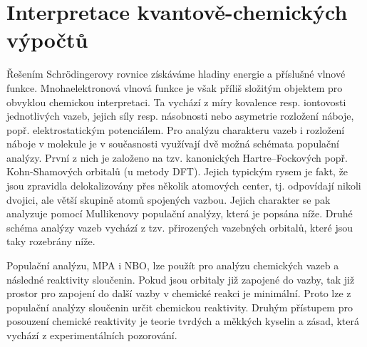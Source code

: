 \documentclass[
digital, %
table,   %
lof,     %
lot,     %
oneside,
]{fithesis3}
\begin{document}
\section{Interpretace kvantově-chemických výpočtů}
Řešením Schrödingerovy rovnice získáváme hladiny energie a příslušné vlnové funkce. Mnohaelektronová vlnová funkce je však příliš složitým objektem pro obvyklou chemickou interpretaci. Ta vychází z míry kovalence resp. iontovosti jednotlivých vazeb, jejich síly resp. násobnosti nebo asymetrie rozložení náboje, popř. elektrostatickým potenciálem. Pro analýzu charakteru vazeb i rozložení náboje v molekule je v současnosti využívají dvě možná schémata populační analýzy. První z nich je založeno na tzv. kanonických Hartre--Fockových popř. Kohn-Shamových orbitalů (u metody DFT). Jejich typickým rysem je fakt, že jsou zpravidla delokalizovány přes několik atomových center, tj. odpovídají nikoli dvojici, ale větší skupině atomů spojených vazbou. Jejich charakter se pak analyzuje pomocí Mullikenovy populační analýzy, která je popsána níže. Druhé schéma analýzy vazeb vychází z tzv. přirozených vazebných orbitalů, které jsou taky rozebrány níže.

Populační analýzu, MPA i NBO, lze použít pro analýzu chemických vazeb a následné reaktivity sloučenin. Pokud jsou orbitaly již zapojené do vazby, tak již prostor pro zapojení do další vazby v chemické reakci je minimální. Proto lze z populační analýzy sloučenin určit chemickou reaktivity. Druhým přístupem pro posouzení chemické reaktivity je teorie tvrdých a měkkých kyselin a zásad, která vychází z experimentálních pozorování.
\end{document}
